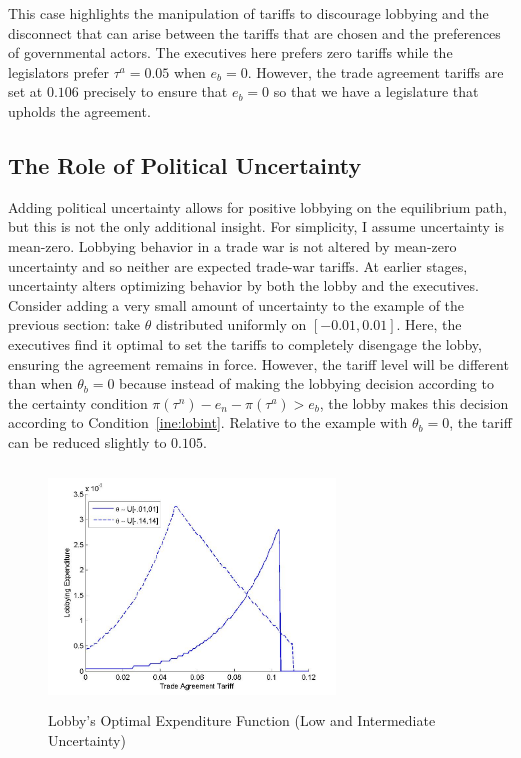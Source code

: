 \documentclass[10pt]{article}
\newcommand{\ve}{\theta}
\newcommand{\ta}{\theta}
\begin{document}
This case highlights the manipulation of tariffs to discourage lobbying and the disconnect that can arise between the tariffs that are chosen and the preferences of governmental actors. The executives here prefers zero tariffs while the legislators prefer $\tau^a = 0.05$ when $e_b = 0$. However, the trade agreement tariffs are set at $0.106$ precisely to ensure that $e_b =0$ so that we have a legislature that upholds the agreement.


\subsection{The Role of Political Uncertainty}
\label{sec:uncertainty}
Adding political uncertainty allows for positive lobbying on the equilibrium path, but this is not the only additional insight. For simplicity, I assume uncertainty is mean-zero. Lobbying behavior in a trade war is not altered by mean-zero uncertainty and so neither are expected trade-war tariffs. At earlier stages, uncertainty alters optimizing behavior by both the lobby and the executives. Consider adding a very small amount of uncertainty to the example of the previous section: take $\ve$ distributed uniformly on $[-0.01,0.01]$. Here, the executives find it optimal to set the tariffs to completely disengage the lobby, ensuring the agreement remains in force. However, the tariff level will be different than when $\ta_b=0$ because instead of making the lobbying decision according to the certainty condition $\pi(\tau^n) - e_n - \pi(\tau^a) > e_b$, the lobby makes this decision according to Condition~\ref{ine:lobint}. Relative to the example with $\ta_b=0$, the tariff can be reduced slightly to $0.105$.

\begin{figure}
\begin{center}
\includegraphics[height=2.5in, width=3in]{lobby_br.jpg}
\end{center}
\caption{Lobby's Optimal Expenditure Function (Low and Intermediate Uncertainty)\label{fig:lobby_br}}
\end{figure}
\end{document}
